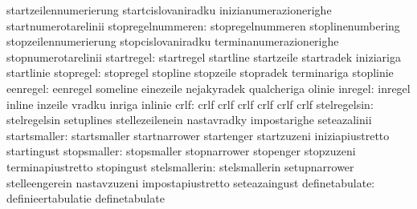                                   startzeilennumerierung           startcislovaniradku
                                  inizianumerazionerighe           startnumerotarelinii
               stopregelnummeren: stopregelnummeren                stoplinenumbering
                                  stopzeilennumerierung            stopcislovaniradku
                                  terminanumerazionerighe          stopnumerotarelinii
                      startregel: startregel                       startline
                                  startzeile                       startradek
                                  iniziariga                       startlinie
                       stopregel: stopregel                        stopline
                                  stopzeile                        stopradek
                                  terminariga                      stoplinie
                        eenregel: eenregel                         someline
                                  einezeile                        nejakyradek
                                  qualcheriga                      olinie
                         inregel: inregel                          inline
                                  inzeile                          vradku
                                  inriga                           inlinie
                            crlf: crlf                             crlf
                                  crlf                             crlf
                                  crlf                             crlf
                    stelregelsin: stelregelsin                     setuplines
                                  stellezeilenein                  nastavradky
                                  impostarighe                     seteazalinii
                    startsmaller: startsmaller                     startnarrower
                                  startenger                       startzuzeni
                                  iniziapiustretto                 startingust
                     stopsmaller: stopsmaller                      stopnarrower
                                  stopenger                        stopzuzeni
                                  terminapiustretto                stopingust
                   stelsmallerin: stelsmallerin                    setupnarrower
                                  stelleengerein                   nastavzuzeni
                                  impostapiustretto                seteazaingust
                  definetabulate: definieertabulatie               definetabulate
